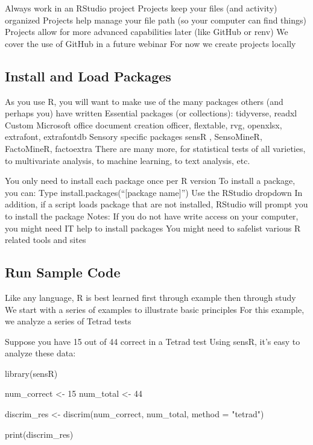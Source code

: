 \documentclass[
]{book}
\newenvironment{Shaded}{\begin{snugshade}}{\end{snugshade}}
\newcommand{\AttributeTok}[1]{\textcolor[rgb]{0.77,0.63,0.00}{#1}}
\newcommand{\DecValTok}[1]{\textcolor[rgb]{0.00,0.00,0.81}{#1}}
\newcommand{\FunctionTok}[1]{\textcolor[rgb]{0.00,0.00,0.00}{#1}}
\newcommand{\NormalTok}[1]{#1}
\newcommand{\OtherTok}[1]{\textcolor[rgb]{0.56,0.35,0.01}{#1}}
\newcommand{\StringTok}[1]{\textcolor[rgb]{0.31,0.60,0.02}{#1}}
\begin{document}
Always work in an RStudio project
Projects keep your files (and activity) organized
Projects help manage your file path (so your computer can find things)
Projects allow for more advanced capabilities later (like GitHub or renv)
We cover the use of GitHub in a future webinar
For now we create projects locally

\hypertarget{install-and-load-packages}{%
\subsection{Install and Load Packages}\label{install-and-load-packages}}

As you use R, you will want to make use of the many packages others (and perhaps you) have written
Essential packages (or collections):
tidyverse, readxl
Custom Microsoft office document creation
officer, flextable, rvg, openxlsx, extrafont, extrafontdb
Sensory specific packages
sensR , SensoMineR, FactoMineR, factoextra
There are many more, for statistical tests of all varieties, to multivariate analysis, to machine learning, to text analysis, etc.

You only need to install each package once per R version
To install a package, you can:
Type install.packages(``{[}package name{]}'')
Use the RStudio dropdown
In addition, if a script loads package that are not installed, RStudio will prompt you to install the package
Notes:
If you do not have write access on your computer, you might need IT help to install packages
You might need to safelist various R related tools and sites

\hypertarget{run-sample-code}{%
\subsection{Run Sample Code}\label{run-sample-code}}

Like any language, R is best learned first through example then through study
We start with a series of examples to illustrate basic principles
For this example, we analyze a series of Tetrad tests

Suppose you have 15 out of 44 correct in a Tetrad test
Using sensR, it's easy to analyze these data:

\begin{Shaded}
\begin{Highlighting}[]
\FunctionTok{library}\NormalTok{(sensR)}

\NormalTok{num\_correct }\OtherTok{\textless{}{-}} \DecValTok{15}  
\NormalTok{num\_total }\OtherTok{\textless{}{-}} \DecValTok{44}  
  
\NormalTok{discrim\_res }\OtherTok{\textless{}{-}} \FunctionTok{discrim}\NormalTok{(num\_correct, num\_total, }\AttributeTok{method =} \StringTok{"tetrad"}\NormalTok{)  }
  
\FunctionTok{print}\NormalTok{(discrim\_res)  }
\end{Highlighting}
\end{Shaded}
\end{document}
